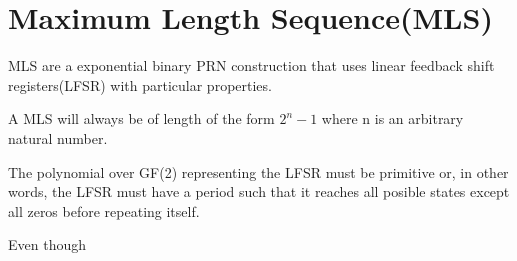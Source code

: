 \section{Maximum Length Sequence(MLS)}

MLS are a exponential binary PRN construction that uses linear
feedback shift registers(LFSR) with particular properties.

\begin{property}
  A MLS will always be of length of the form $2^{n}-1$ where n is an arbitrary
  natural number.
\end{property}

\begin{property}
  The polynomial over GF(2) representing the LFSR must be primitive or,
  in other words, the LFSR must have a period such that it reaches all posible
  states except all zeros before repeating itself.
\end{property}

Even though

